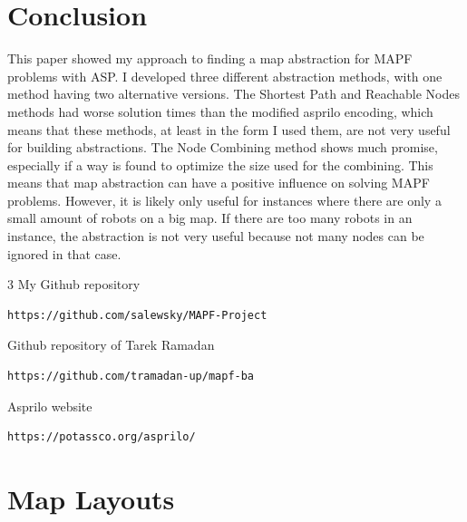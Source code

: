 \documentclass[runningheads]{llncs}
\begin{document}
\section{Conclusion}
This paper showed my approach to finding a map abstraction for MAPF problems with ASP. I developed three different abstraction methods, with one method having two alternative versions. The Shortest Path and Reachable Nodes methods had worse solution times than the modified asprilo encoding, which means that these methods, at least in the form I used them, are not very useful for building abstractions. The Node Combining method shows much promise, especially if a way is found to optimize the size used for the combining. This means that map abstraction can have a positive influence on solving MAPF problems. However, it is likely only useful for instances where there are only a small amount of robots on a big map. If there are too many robots in an instance, the abstraction is not very useful because not many nodes can be ignored in that case. 
\newpage

\begin{thebibliography} {3}
My Github repository
\begin{verbatim}
https://github.com/salewsky/MAPF-Project
\end{verbatim}

Github repository of Tarek Ramadan
\begin{verbatim}
https://github.com/tramadan-up/mapf-ba
\end{verbatim}

Asprilo website
\begin{verbatim}
https://potassco.org/asprilo/
\end{verbatim}


\end{thebibliography}

\newpage
\appendix

\section{Map Layouts}
\end{document}
